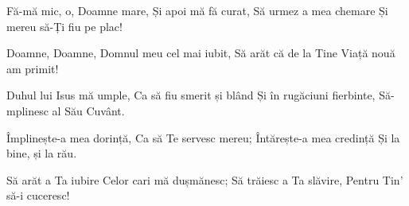 \beginverse
Fă-mă mic, o, Doamne mare,
Și apoi mă fă curat,
Să urmez a mea chemare
Și mereu să-Ți fiu pe plac!
\endverse

\beginchorus
Doamne, Doamne,
Domnul meu cel mai iubit,
Să arăt că de la Tine
Viață nouă am primit!
\endchorus

\beginverse
Duhul lui Isus mă umple,
Ca să fiu smerit și blând
Și în rugăciuni fierbinte,
Să-mplinesc al Său Cuvânt.
\endverse

\beginverse
Împlinește-a mea dorință,
Ca să Te servesc mereu;
Întărește-a mea credință
Și la bine, și la rău.
\endverse

\beginverse
Să arăt a Ta iubire
Celor cari mă dușmănesc;
Să trăiesc a Ta slăvire,
Pentru Tin’ să-i cuceresc!
\endverse
\endsong